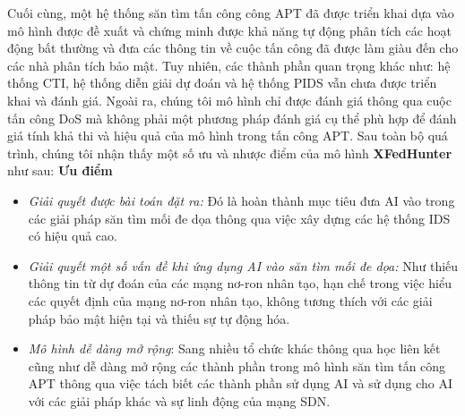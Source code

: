 \bigbreak\noindent
Cuối cùng, một hệ thống săn tìm tấn công công APT đã được triển khai dựa vào mô hình được đề xuất và chứng minh được khả năng tự động phân tích các hoạt động bất thường và đưa các thông tin về cuộc tấn công đã được làm giàu đến cho các nhà phân tích bảo mật. Tuy nhiên, các thành phần quan trọng khác như: hệ thống CTI, hệ thống diễn giải dự đoán và hệ thống PIDS vẫn chưa được triển khai và đánh giá. Ngoài ra, chúng tôi mô hình chỉ được đánh giá thông qua cuộc tấn công DoS mà không phải một phương pháp đánh giá cụ thể phù hợp để đánh giá tính khả thi và hiệu quả của mô hình trong tấn công APT.
\bigbreak\noindent
Sau toàn bộ quá trình, chúng tôi nhận thấy một số ưu và nhược điểm của mô hình \textbf{XFedHunter} như sau:
\bigbreak\noindent
\textbf{Ưu điểm}
\begin{itemize}
    \item \textit{Giải quyết được bài toán đặt ra:} Đó là hoàn thành mục tiêu đưa AI vào trong các giải pháp săn tìm mối đe dọa thông qua việc xây dựng các hệ thống IDS có hiệu quả cao.

    \item \textit{Giải quyết một số vấn đề khi ứng dụng AI vào săn tìm mối đe dọa:} Như thiếu thông tin từ dự đoán của các mạng nơ-ron nhân tạo, hạn chế trong việc hiểu các quyết định của mạng nơ-ron nhân tạo, không tương thích với các giải pháp bảo mật hiện tại và thiếu sự tự động hóa.

    \item \textit{Mô hình dễ dàng mở rộng}: Sang nhiều tổ chức khác thông qua học liên kết cũng như dễ dàng mở rộng các thành phần trong mô hình săn tìm tấn công APT thông qua việc tách biết các thành phần sử dụng AI và sử dụng cho AI với các giải pháp khác và sự linh động của mạng SDN.
\end{itemize}

